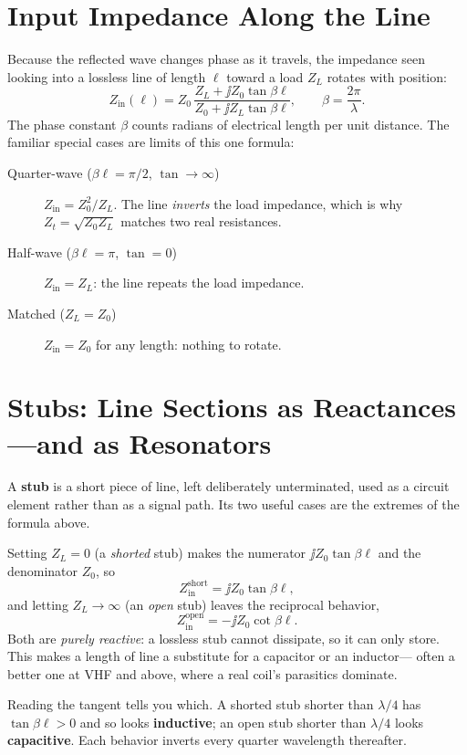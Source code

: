 \section{Input Impedance Along the Line}
Because the reflected wave changes phase as it travels, the impedance seen
looking into a lossless line of length \(\ell\) toward a load \(Z_L\) rotates with
position:
\[
Z_{\mathrm{in}}(\ell)=Z_0\,
\frac{Z_L+\jj Z_0\tan\beta\ell}{Z_0+\jj Z_L\tan\beta\ell},
\qquad
\beta=\frac{2\pi}{\lambda}.
\]
The phase constant \(\beta\) counts radians of electrical length per unit
distance. The familiar special cases are limits of this one formula:
\begin{description}
\item[Quarter-wave (\(\beta\ell=\pi/2\), \(\tan\to\infty\))]
\(Z_{\mathrm{in}}=Z_0^2/Z_L\). The line \emph{inverts} the load impedance, which
is why \(Z_t=\sqrt{Z_0 Z_L}\) matches two real resistances.
\item[Half-wave (\(\beta\ell=\pi\), \(\tan=0\))] \(Z_{\mathrm{in}}=Z_L\): the line
repeats the load impedance.
\item[Matched (\(Z_L=Z_0\))] \(Z_{\mathrm{in}}=Z_0\) for any length: nothing to
rotate.
\end{description}
\section{Stubs: Line Sections as Reactances---and as Resonators}
\label{sec:stubs}
A \textbf{stub} is a short piece of line, left deliberately unterminated, used as a
circuit element rather than as a signal path. Its two useful cases are the extremes
of the formula above.

Setting \(Z_L=0\) (a \emph{shorted} stub) makes the numerator \(\jj Z_0\tan\beta\ell\)
and the denominator \(Z_0\), so
\[
Z_{\mathrm{in}}^{\text{short}}=\jj Z_0\tan\beta\ell ,
\]
and letting \(Z_L\to\infty\) (an \emph{open} stub) leaves the reciprocal behavior,
\[
Z_{\mathrm{in}}^{\text{open}}=-\jj Z_0\cot\beta\ell .
\]
Both are \emph{purely reactive}: a lossless stub cannot dissipate, so it can only
store. This makes a length of line a substitute for a capacitor or an inductor---
often a better one at VHF and above, where a real coil's parasitics dominate.

Reading the tangent tells you which. A shorted stub shorter than \(\lambda/4\) has
\(\tan\beta\ell>0\) and so looks \textbf{inductive}; an open stub shorter than
\(\lambda/4\) looks \textbf{capacitive}. Each behavior inverts every quarter
wavelength thereafter.

